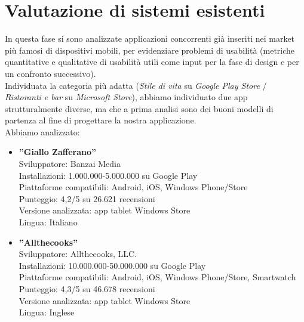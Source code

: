 \documentclass[12pt,a4paper,openright,twoside]{article}
\begin{document}
\section{Valutazione di sistemi esistenti}

In questa fase si sono analizzate applicazioni concorrenti già inseriti nei market più famosi di dispositivi mobili, per evidenziare problemi di usabilità (metriche quantitative e qualitative di usabilità utili come input per la fase di design e per un confronto successivo).\\
Individuata la categoria più adatta (\textit{Stile di vita} su \textit{Google Play Store} / \textit{Ristoranti e bar} su \textit{Microsoft Store}), abbiamo individuato due app strutturalmente
diverse, ma che a prima analisi sono dei buoni modelli di partenza al fine di progettare la nostra applicazione.\\
Abbiamo analizzato:
\begin{itemize}
\item \textbf{”Giallo Zafferano”}\\
Sviluppatore: Banzai Media\\
Installazioni: 1.000.000-5.000.000 su Google Play\\
Piattaforme compatibili: Android, iOS, Windows Phone/Store\\
Punteggio: 4,2/5 su 26.621 recensioni\\
Versione analizzata: app tablet Windows Store\\
Lingua: Italiano\\
\item \textbf{”Allthecooks”}\\
Sviluppatore: Allthecooks, LLC.\\
Installazioni: 10.000.000-50.000.000 su Google Play\\
Piattaforme compatibili: Android, iOS, Windows Phone/Store, Smartwatch\\
Punteggio: 4,3/5 su 46.678 recensioni\\
Versione analizzata: app tablet Windows Store\\
Lingua: Inglese\\
\end{itemize} 
\end{document}
